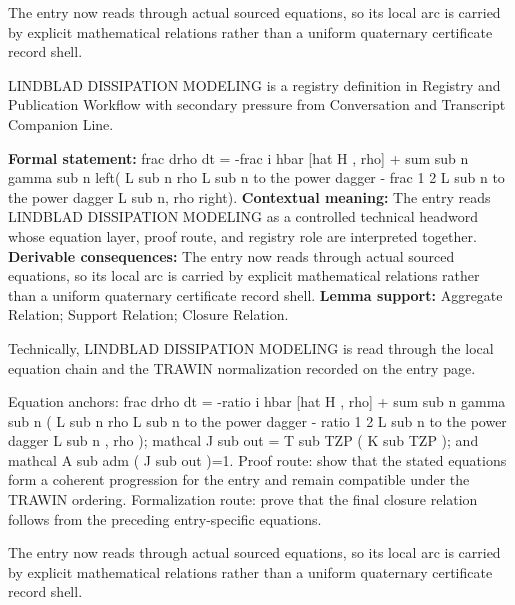 The entry now reads through actual sourced equations, so its local arc is carried by explicit mathematical relations rather than a uniform quaternary certificate record shell.
\clearpage


\begingroup\small
{}
LINDBLAD DISSIPATION MODELING is a registry definition in Registry and Publication Workflow with secondary pressure from Conversation and Transcript Companion Line.

\begingroup\footnotesize\setlength{\emergencystretch}{3em}\sloppy
\textbf{Formal statement:} frac drho dt = -frac i hbar [hat H , rho] + sum sub n gamma sub n left( L sub n rho L sub n to the power dagger - frac 1 2 L sub n to the power dagger L sub n, rho right). \textbf{Contextual meaning:} The entry reads LINDBLAD DISSIPATION MODELING as a controlled technical headword whose equation layer, proof route, and registry role are interpreted together. \textbf{Derivable consequences:} The entry now reads through actual sourced equations, so its local arc is carried by explicit mathematical relations rather than a uniform quaternary certificate record shell. \textbf{Lemma support:} Aggregate Relation; Support Relation; Closure Relation.\par
\endgroup

Technically, LINDBLAD DISSIPATION MODELING is read through the local equation chain and the TRAWIN normalization recorded on the entry page.

Equation anchors: frac drho dt = -ratio i hbar [hat H , rho] + sum sub n gamma sub n ( L sub n rho L sub n to the power dagger - ratio 1 2 L sub n to the power dagger L sub n , rho ); mathcal J sub out = T sub TZP ( K sub TZP ); and mathcal A sub adm ( J sub out )=1. Proof route: show that the stated equations form a coherent progression for the entry and remain compatible under the TRAWIN ordering. Formalization route: prove that the final closure relation follows from the preceding entry-specific equations.

The entry now reads through actual sourced equations, so its local arc is carried by explicit mathematical relations rather than a uniform quaternary certificate record shell.
\endgroup

